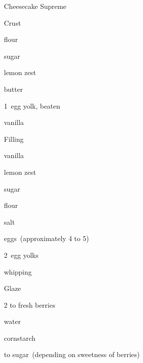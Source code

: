\begin{recipe}{Cheesecake Supreme}{}{}

Crust
\begin{ingredients}
\item {} flour
\item \C{\quarter} sugar
\item {} lemon zest
\item \C{\half} butter
\item 1~egg yolk, beaten
\item \tp{\quarter} vanilla
\end{ingredients}

Filling
\begin{ingredients}
\item {} 
\item \tp{\quarter} vanilla
\item \tp{\threequarter} lemon zest
\item \C{1\third} sugar
\item {} flour
\item \tp{\quarter} salt
\item {} eggs~(approximately 4 to 5)
\item 2~egg yolks
\item \C{\quarter} whipping 
\end{ingredients}

Glaze
\begin{ingredients}
\item 2 to  fresh berries
\item {} water
\item \tp{1\half} cornstarch
\item \half{} to \C{\threequarter} sugar~(depending on sweetness of berries)
\end{ingredients}


\end{recipe}

